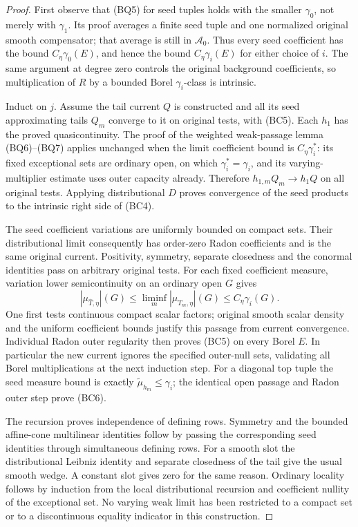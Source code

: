\documentclass[11pt,a4paper]{article}
\numberwithin{equation}{section}
\theoremstyle{definition}
\theoremstyle{remark}
\begin{document}
\begin{proof}
First observe that (BQ5) for seed tuples holds with the smaller
$\gamma_0$, not merely with $\gamma_1$. Its proof averages a
finite seed tuple and one normalized original smooth compensator;
that average is still in $\mathcal A_0$. Thus every seed
coefficient has the bound $C_\eta\gamma_0(E)$, and hence the
bound $C_\eta\gamma_i(E)$ for either choice of $i$.
The same argument at degree zero controls the original background
coefficients, so multiplication of $R$ by a bounded Borel
$\gamma_i$-class is intrinsic.

Induct on $j$. Assume the tail current $Q$ is constructed and
all its seed approximating tails $Q_m$ converge to it on original
tests, with (BC5). Each $h_1$ has the proved quasicontinuity.
The proof of the weighted weak-passage lemma (BQ6)--(BQ7) applies
unchanged when the limit coefficient bound is $C_\eta\gamma_i^*$:
its fixed exceptional sets are ordinary open, on which
$\gamma_i^*=\gamma_i$, and its varying-multiplier estimate uses
outer capacity already. Therefore
$h_{1,m}Q_m\to h_1Q$ on all original tests. Applying
distributional $D$ proves convergence of the seed products to
the intrinsic right side of (BC4).

The seed coefficient variations are uniformly bounded on compact
sets. Their distributional limit consequently has order-zero
Radon coefficients and is the same original current. Positivity,
symmetry, separate closedness and the conormal identities pass
on arbitrary original tests. For each fixed coefficient measure,
variation lower semicontinuity on an ordinary open $G$ gives
\[
        |\mu_{\widehat T,\eta}|(G)
                 \leq\liminf_m|\mu_{T_m,\eta}|(G)
                 \leq C_\eta\gamma_i(G).
 \tag{BC7}
\]
One first tests continuous compact scalar factors; original
smooth scalar density and the uniform coefficient bounds justify
this passage from current convergence. Individual Radon outer
regularity then proves (BC5) on every Borel $E$. In particular
the new current ignores the specified outer-null sets, validating
all Borel multiplications at the next induction step. For a
diagonal top tuple the seed measure bound is exactly
$\widetilde\mu_{h_m}\leq\gamma_i$; the identical open passage
and Radon outer step prove (BC6).

The recursion proves independence of defining rows. Symmetry and
the bounded affine-cone multilinear identities follow by passing
the corresponding seed identities through simultaneous defining
rows. For a smooth slot the distributional Leibniz identity and
separate closedness of the tail give the usual smooth wedge.
A constant slot gives zero for the same reason. Ordinary locality
follows by induction from the local distributional recursion and
coefficient nullity of the exceptional set. No varying weak limit
has been restricted to a compact set or to a discontinuous
equality indicator in this construction.
\end{proof}
\end{document}
